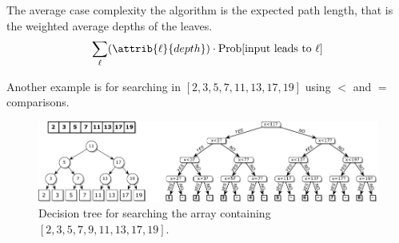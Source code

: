 The average case complexity the algorithm is the expected path length, that is the weighted average depths of the leaves.
$$
\sum_{\ell} (\attrib{\ell}{depth}) \cdot \Prob [\text{input leads to $\ell$}]
$$

Another example is for searching in $[2,3,5,7,11,13,17,19]$ using $<$ and $=$ comparisons. 

\hfill

\begin{figure}[htbp]
    \centering
    \includegraphics[width=\linewidth]{figures/binary_search_decision_tree.pdf}
    \caption{Decision tree for searching the array containing $[2,3,5,7,9,11,13,17,19]$.}
    \label{fig:sorting-tree-2}
\end{figure}
